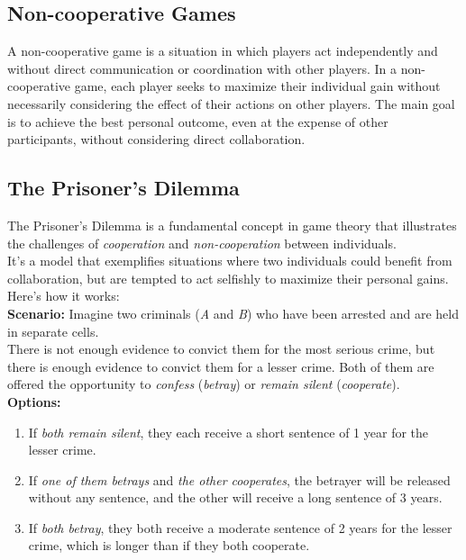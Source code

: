 \subsection{Non-cooperative Games}
A non-cooperative game is a situation in which players act independently and without direct communication or coordination with other players.
In a non-cooperative game, each player seeks to maximize their individual gain without necessarily considering the effect of their actions on other players.
The main goal is to achieve the best personal outcome, even at the expense of other participants, without considering direct collaboration.


\subsection{The Prisoner's Dilemma}
The Prisoner's Dilemma is a fundamental concept in game theory that illustrates the challenges of \textit{cooperation} and \textit{non-cooperation} between individuals. \\
It's a model that exemplifies situations where two individuals could benefit from collaboration, but are tempted to act selfishly to maximize their personal gains. \\
Here's how it works:
\\

\textbf{Scenario:}
Imagine two criminals (\textit{A} and \textit{B}) who have been arrested and are held in separate cells. \\
There is not enough evidence to convict them for the most serious crime, but there is enough evidence to convict them for a lesser crime.
Both of them are offered the opportunity to \textit{confess} (\textit{betray}) or \textit{remain silent} (\textit{cooperate}).
\\

\textbf{Options:}
\begin{enumerate}
    \item {If \textit{both remain silent}, they each receive a short sentence of 1 year for the lesser crime.}
    \item {If \textit{one of them betrays} and \textit{the other cooperates}, the betrayer will be released without any sentence, and the other will receive a long sentence of 3 years.}
    \item {If \textit{both betray}, they both receive a moderate sentence of 2 years for the lesser crime, which is longer than if they both cooperate.}
\end{enumerate}

